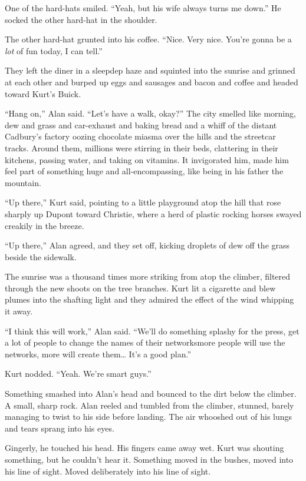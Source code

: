 One of the hard-hats smiled.  ``Yeah, but his wife always turns me
down.'' He socked the other hard-hat in the shoulder.

The other hard-hat grunted into his coffee.  ``Nice.  Very nice. 
You're gonna be a \textit{lot} of fun today, I can tell.''

They left the diner in a sleepdep haze and squinted into the sunrise
and grinned at each other and burped up eggs and sausages and bacon
and coffee and headed toward Kurt's Buick.

``Hang on,'' Alan said.  ``Let's have a walk, okay?'' The city smelled
like morning, dew and grass and car-exhaust and baking bread and a
whiff of the distant Cadbury's factory oozing chocolate miasma over
the hills and the streetcar tracks.  Around them, millions were
stirring in their beds, clattering in their kitchens, passing water,
and taking on vitamins.  It invigorated him, made him feel part of
something huge and all-encompassing, like being in his father the
mountain.

``Up there,'' Kurt said, pointing to a little playground atop the hill
that rose sharply up Dupont toward Christie, where a herd of plastic
rocking horses swayed creakily in the breeze.

``Up there,'' Alan agreed, and they set off, kicking droplets of dew
off the grass beside the sidewalk.

The sunrise was a thousand times more striking from atop the climber,
filtered through the new shoots on the tree branches.  Kurt lit a
cigarette and blew plumes into the shafting light and they admired the
effect of the wind whipping it away.

``I think this will work,'' Alan said.  ``We'll do something splashy
for the press, get a lot of people to change the names of their
networks\dash{}more people will use the networks, more will create them\ldots{} 
It's a good plan.''

Kurt nodded.  ``Yeah.  We're smart guys.''

Something smashed into Alan's head and bounced to the dirt below the
climber.  A small, sharp rock.  Alan reeled and tumbled from the
climber, stunned, barely managing to twist to his side before landing. 
The air whooshed out of his lungs and tears sprang into his eyes.

Gingerly, he touched his head.  His fingers came away wet.  Kurt was
shouting something, but he couldn't hear it.  Something moved in the
bushes, moved into his line of sight.  Moved deliberately into his
line of sight.

